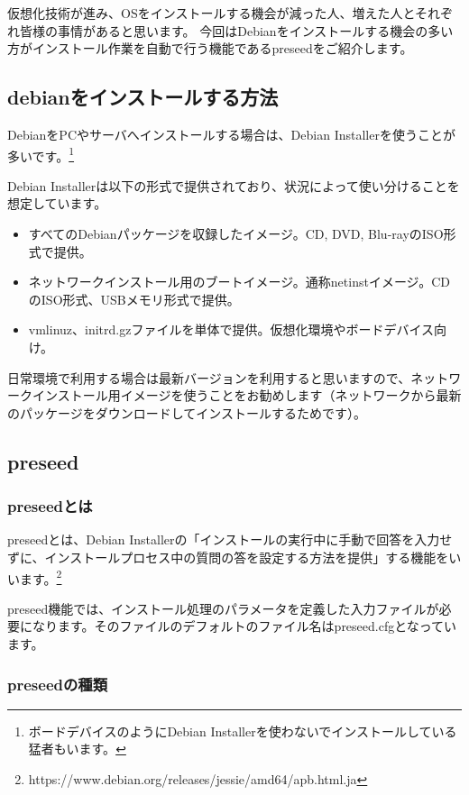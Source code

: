 \documentclass[mingoth,a4paper]{jsarticle}
\begin{document}
仮想化技術が進み、OSをインストールする機会が減った人、増えた人とそれぞれ皆様の事情があると思います。
今回はDebianをインストールする機会の多い方がインストール作業を自動で行う機能であるpreseedをご紹介します。

\subsection{debianをインストールする方法}

DebianをPCやサーバへインストールする場合は、Debian Installerを使うことが多いです。\footnote{ボードデバイスのようにDebian Installerを使わないでインストールしている猛者もいます。}

Debian Installerは以下の形式で提供されており、状況によって使い分けることを想定しています。

\begin{itemize}
\item すべてのDebianパッケージを収録したイメージ。CD, DVD, Blu-rayのISO形式で提供。
\item ネットワークインストール用のブートイメージ。通称netinstイメージ。CDのISO形式、USBメモリ形式で提供。
\item vmlinuz、initrd.gzファイルを単体で提供。仮想化環境やボードデバイス向け。
\end{itemize}

日常環境で利用する場合は最新バージョンを利用すると思いますので、ネットワークインストール用イメージを使うことをお勧めします（ネットワークから最新のパッケージをダウンロードしてインストールするためです）。


\subsection{preseed}
\subsubsection{preseedとは}

preseedとは、Debian Installerの「インストールの実行中に手動で回答を入力せずに、インストールプロセス中の質問の答を設定する方法を提供」する機能をいいます。\footnote{https://www.debian.org/releases/jessie/amd64/apb.html.ja}

preseed機能では、インストール処理のパラメータを定義した入力ファイルが必要になります。そのファイルのデフォルトのファイル名はpreseed.cfgとなっています。

\subsubsection{preseedの種類}
\end{document}
